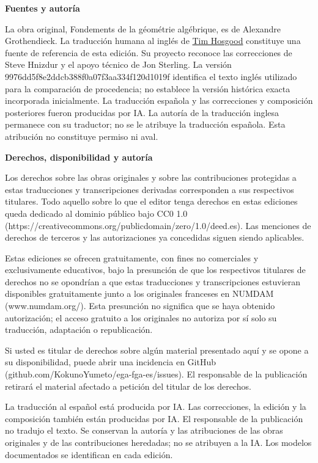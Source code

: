 \documentclass[11pt,twoside,openany]{book}
\theoremstyle{plain}
\theoremstyle{definition}
\theoremstyle{remark}
\begin{document}
\begingroup
\small
\noindent\textbf{Fuentes y autoría}

La obra original, Fondements de la géométrie algébrique, es de Alexandre Grothendieck. La traducción humana al inglés de \href{https://github.com/thosgood/fga/tree/9976dd5f8e2ddcb388f0a07f3aa334f120d1019f}{Tim Hosgood} constituye una fuente de referencia de esta edición. Su proyecto reconoce las correcciones de Steve Hnizdur y el apoyo técnico de Jon Sterling. La versión 9976dd5f8e2ddcb388f0a07f3aa334f120d1019f identifica el texto inglés utilizado para la comparación de procedencia; no establece la versión histórica exacta incorporada inicialmente. La traducción española y las correcciones y composición posteriores fueron producidas por IA. La autoría de la traducción inglesa permanece con su traductor; no se le atribuye la traducción española. Esta atribución no constituye permiso ni aval.

\noindent\textbf{Derechos, disponibilidad y autoría}

Los derechos sobre las obras originales y sobre las contribuciones protegidas a estas traducciones y transcripciones derivadas corresponden a sus respectivos titulares. Todo aquello sobre lo que el editor tenga derechos en estas ediciones queda dedicado al dominio público bajo CC0 1.0 (https://creativecommons.org/publicdomain/zero/1.0/deed.es). Las menciones de derechos de terceros y las autorizaciones ya concedidas siguen siendo aplicables.

Estas ediciones se ofrecen gratuitamente, con fines no comerciales y exclusivamente educativos, bajo la presunción de que los respectivos titulares de derechos no se opondrían a que estas traducciones y transcripciones estuvieran disponibles gratuitamente junto a los originales franceses en NUMDAM (www.numdam.org/). Esta presunción no significa que se haya obtenido autorización; el acceso gratuito a los originales no autoriza por sí solo su traducción, adaptación o republicación.

Si usted es titular de derechos sobre algún material presentado aquí y se opone a su disponibilidad, puede abrir una incidencia en GitHub (github.com/KokunoYumeto/ega-fga-es/issues). El responsable de la publicación retirará el material afectado a petición del titular de los derechos.

La traducción al español está producida por IA. Las correcciones, la edición y la composición también están producidas por IA. El responsable de la publicación no tradujo el texto. Se conservan la autoría y las atribuciones de las obras originales y de las contribuciones heredadas; no se atribuyen a la IA. Los modelos documentados se identifican en cada edición.
\par
\endgroup
\clearpage
\end{document}
